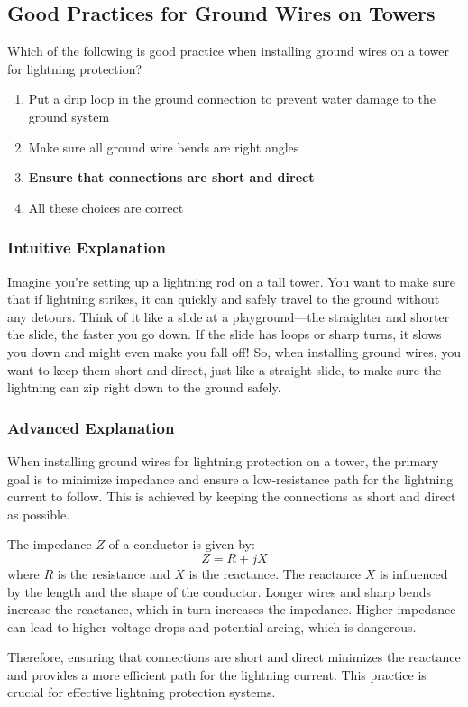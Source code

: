 \subsection{Good Practices for Ground Wires on Towers}
\label{T0B01}

\begin{tcolorbox}[colback=gray!10!white,colframe=black!75!black,title=T0B01]
Which of the following is good practice when installing ground wires on a tower for lightning protection?
\begin{enumerate}[label=\Alph*]
    \item Put a drip loop in the ground connection to prevent water damage to the ground system
    \item Make sure all ground wire bends are right angles
    \item \textbf{Ensure that connections are short and direct}
    \item All these choices are correct
\end{enumerate}
\end{tcolorbox}

\subsubsection{Intuitive Explanation}
Imagine you're setting up a lightning rod on a tall tower. You want to make sure that if lightning strikes, it can quickly and safely travel to the ground without any detours. Think of it like a slide at a playground—the straighter and shorter the slide, the faster you go down. If the slide has loops or sharp turns, it slows you down and might even make you fall off! So, when installing ground wires, you want to keep them short and direct, just like a straight slide, to make sure the lightning can zip right down to the ground safely.

\subsubsection{Advanced Explanation}
When installing ground wires for lightning protection on a tower, the primary goal is to minimize impedance and ensure a low-resistance path for the lightning current to follow. This is achieved by keeping the connections as short and direct as possible. 

The impedance \( Z \) of a conductor is given by:
\[ Z = R + jX \]
where \( R \) is the resistance and \( X \) is the reactance. The reactance \( X \) is influenced by the length and the shape of the conductor. Longer wires and sharp bends increase the reactance, which in turn increases the impedance. Higher impedance can lead to higher voltage drops and potential arcing, which is dangerous.

Therefore, ensuring that connections are short and direct minimizes the reactance and provides a more efficient path for the lightning current. This practice is crucial for effective lightning protection systems.

